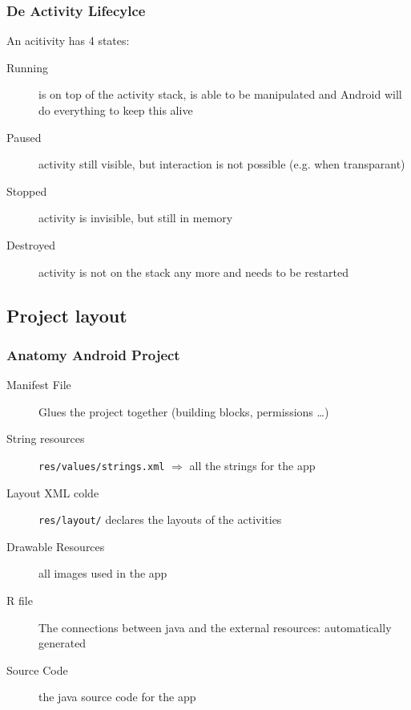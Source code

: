 \documentclass{beamer}
\begin{document}
\begin{frame}
	\frametitle{De Activity Lifecylce}
	An acitivity has 4 states:
	
	\begin{description}
		\item [Running] is on top of the activity stack, is able to be manipulated and Android will do everything to keep this alive
		\item [Paused]  activity still visible, but interaction is not possible (e.g. when transparant)
		\item [Stopped] activity is invisible, but still in memory
		\item [Destroyed] activity is not on the stack any more and needs to be restarted
	\end{description}
\end{frame}


{
	\begin{frame}[plain]
	\end{frame}
}

\subsection{Project layout}
\begin{frame}
	\frametitle{Anatomy Android Project }
	\begin{description}
		\item [Manifest File] Glues the project together (building blocks, permissions \dots)
		\item [String resources] \texttt{res/values/strings.xml} $\Rightarrow$ all the strings for the app
		\item [Layout XML colde] \texttt{res/layout/} declares the layouts of the activities
		\item [Drawable Resources] all images used in the app
		\item [R file] The connections between java and the external resources: automatically generated
		\item [Source Code]	the java source code for the app
	\end{description}
\end{frame}
\end{document}
